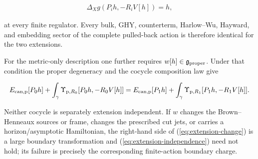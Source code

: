 \begin{align}
\Delta_Xg(P_i h,-R_iV[h])=h,
\end{align}

at every finite regulator. Every bulk, GHY, counterterm, Harlow--Wu, Hayward, and embedding sector of the complete pulled-back action is therefore identical for the two extensions.

For the metric-only description one further requires $w[h]\in\mathfrak g_{\rm proper}$. Under that condition the proper degeneracy and the cocycle composition law give

\begin{align}
E_{{\rm can,p}}[P_0h]
+\int_\gamma\Upsilon_{{\rm p},R_0}[P_0h,-R_0V[h]]
=E_{{\rm can,p}}[P_1h]
+\int_\gamma\Upsilon_{{\rm p},R_1}[P_1h,-R_1V[h]].
\label{eq:extension-independence}
\end{align}

Neither cocycle is separately extension independent. If $w$ changes the Brown--Henneaux sources or frame, changes the prescribed cut jets, or carries a horizon/asymptotic Hamiltonian, the right-hand side of (\ref{eq:extension-change}) is a large boundary transformation and (\ref{eq:extension-independence}) need not hold; its failure is precisely the corresponding finite-action boundary charge.

